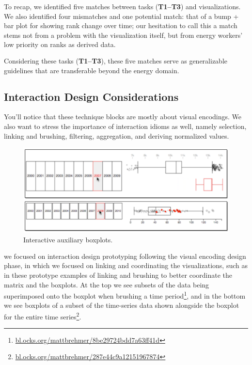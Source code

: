 \documentclass[journal]{vgtc}                %
\newcommand{\bstart}[1]{\vspace{1mm} \noindent{\textbf{#1:}}}
\begin{document}
To recap, we identified five matches between tasks ({\bf T1--T3}) and visualizations. 
We also identified four mismatches and one potential match: that of a bump + bar plot for showing rank change over time; our hesitation to call this a match stems not from a problem with the visualization itself, but from energy workers' low priority on ranks as derived data.

Considering these tasks ({\bf T1--T3}), these five matches serve as generalizable guidelines that are transferable beyond the energy domain.


\subsection{Interaction Design Considerations}
\label{design-interaction}


You'll notice that these technique blocks are mostly about visual encodings. 
We also want to stress the importance of interaction idioms as well, namely selection, linking and brushing, filtering, aggregation, and deriving normalized values.

\begin{figure}[ht]
	\centering
	\includegraphics[width=\columnwidth]{figures/d3-boxplots.pdf}
	\vspace{-0.6cm}
	\caption{Interactive auxiliary boxplots.}
	\label{fig:interactive-boxplots}
	\vspace{-0.3cm}
\end{figure}

\bstart{Interactive auxiliary boxplots} we focused on interaction design prototyping following the visual encoding design phase, in which we focused on linking and coordinating the visualizations, such as in these prototype examples of linking and brushing to better coordinate the matrix and the boxplots. 
At the top we see subsets of the data being superimposed onto the boxplot when brushing a time period\footnote{\url{bl.ocks.org/mattbrehmer/8be29724bdd7a63ff41d}}, and in the bottom we see boxplots of a subset of the time-series data shown alongside the boxplot for the entire time series\footnote{\url{bl.ocks.org/mattbrehmer/287e44c9a12151967874}}. 
\end{document}
